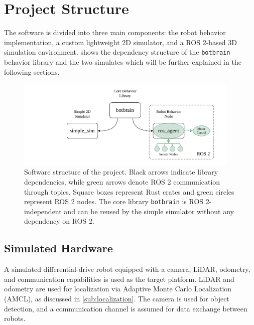 \section{Project Structure}
The software is divided into three main components: the robot behavior implementation, a custom lightweight 2D simulator, and a ROS 2-based 3D simulation environment.  shows the dependency structure of the \texttt{botbrain} behavior library and the two simulates which will be further explained in the following sections.

\begin{figure}[H]
    \begin{center}
        \includegraphics[width=0.95\textwidth]{figures/software-structure.pdf}
    \end{center}
    \caption{Software structure of the project. Black arrows indicate library dependencies, while green arrows denote ROS 2 communication through topics. Square boxes represent Rust crates and green circles represent ROS 2 nodes. The core library \texttt{botbrain} is ROS 2-independent and can be reused by the simple simulator without any dependency on ROS 2.}
    \label{fig:software-structure}
\end{figure}

\subsection{Simulated Hardware}

A simulated differential-drive robot equipped with a camera, LiDAR, odometry, and communication capabilities is used as the target platform. LiDAR and odometry are used for localization via Adaptive Monte Carlo Localization (AMCL), as discussed in \cref{sub:localization}. The camera is used for object detection, and a communication channel is assumed for data exchange between robots.\\

